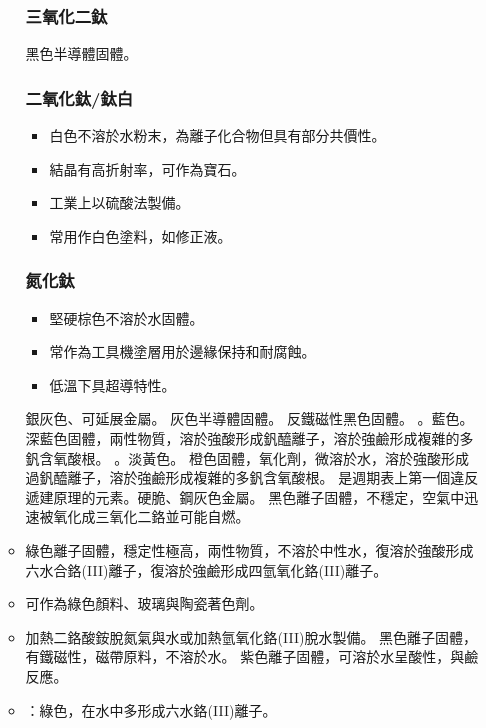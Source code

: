 \documentclass[a4paper,12pt]{report}
\begin{document}
\begin{itemize}
\begin{itemize}
\subsubsection{三氧化二鈦}
黑色半導體固體。
\subsubsection{二氧化鈦/鈦白}
\begin{itemize}
\item 白色不溶於水粉末，為離子化合物但具有部分共價性。
\item 結晶有高折射率，可作為寶石。
\item 工業上以硫酸法製備。
\item 常用作白色塗料，如修正液。
\end{itemize}
\subsubsection{氮化鈦}
\begin{itemize}
\item 堅硬棕色不溶於水固體。
\item 常作為工具機塗層用於邊緣保持和耐腐蝕。
\item 低溫下具超導特性。
\end{itemize}
銀灰色、可延展金屬。
灰色半導體固體。
反鐵磁性黑色固體。
。藍色。
深藍色固體，兩性物質，溶於強酸形成釩醯離子，溶於強鹼形成複雜的多釩含氧酸根。
。淡黃色。
橙色固體，氧化劑，微溶於水，溶於強酸形成過釩醯離子，溶於強鹼形成複雜的多釩含氧酸根。
是週期表上第一個違反遞建原理的元素。硬脆、鋼灰色金屬。
黑色離子固體，不穩定，空氣中迅速被氧化成三氧化二鉻並可能自燃。
\bit
\item 綠色離子固體，穩定性極高，兩性物質，不溶於中性水，復溶於強酸形成六水合鉻(III)離子，復溶於強鹼形成四氫氧化鉻(III)離子。
\item 可作為綠色顏料、玻璃與陶瓷著色劑。
\item 加熱二鉻酸銨脫氮氣與水或加熱氫氧化鉻(III)脫水製備。
\eit
{}
黑色離子固體，有鐵磁性，磁帶原料，不溶於水。
紫色離子固體，可溶於水呈酸性，與鹼反應。
\bit
\item {}：綠色，在水中多形成六水鉻(III)離子。

\end{itemize}
\end{itemize}
\end{document}
